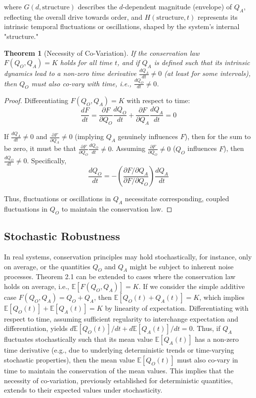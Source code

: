 \documentclass[11pt,a4paper]{article}
\newtheorem{theorem}{Theorem}[section]
\begin{document}
where $G(d, \text{structure})$ describes the $d$-dependent magnitude (envelope) of $Q_A$, reflecting the overall drive towards order, and $H(\text{structure}, t)$ represents its intrinsic temporal fluctuations or oscillations, shaped by the system's internal "structure."

\begin{theorem}[Necessity of Co-Variation]
If the conservation law $F(Q_O, Q_A) = K$ holds for all time $t$, and if $Q_A$ is defined such that its intrinsic dynamics lead to a non-zero time derivative $\frac{dQ_A}{dt} \neq 0$ (at least for some intervals), then $Q_O$ must also co-vary with time, i.e., $\frac{dQ_O}{dt} \neq 0$.
\end{theorem}

\begin{proof}
Differentiating $F(Q_O, Q_A) = K$ with respect to time:
\begin{equation}
    \frac{dF}{dt} = \frac{\partial F}{\partial Q_O}\frac{dQ_O}{dt} + \frac{\partial F}{\partial Q_A}\frac{dQ_A}{dt} = 0
\end{equation}

If $\frac{dQ_A}{dt} \neq 0$ and $\frac{\partial F}{\partial Q_A} \neq 0$ (implying $Q_A$ genuinely influences $F$), then for the sum to be zero, it must be that $\frac{\partial F}{\partial Q_O}\frac{dQ_O}{dt} \neq 0$. Assuming $\frac{\partial F}{\partial Q_O} \neq 0$ ($Q_O$ influences $F$), then $\frac{dQ_O}{dt} \neq 0$. Specifically,
\begin{equation}
    \frac{dQ_O}{dt} = - \left(\frac{\partial F/\partial Q_A}{\partial F/\partial Q_O}\right) \frac{dQ_A}{dt}
\end{equation}

Thus, fluctuations or oscillations in $Q_A$ necessitate corresponding, coupled fluctuations in $Q_O$ to maintain the conservation law.
\end{proof}

\subsection{Stochastic Robustness}
In real systems, conservation principles may hold stochastically, for instance, only on average, or the quantities $Q_O$ and $Q_A$ might be subject to inherent noise processes.
Theorem 2.1 can be extended to cases where the conservation law holds on average, i.e., $\mathbb{E}[F(Q_O, Q_A)] = K$. If we consider the simple additive case $F(Q_O, Q_A) = Q_O + Q_A$, then $\mathbb{E}[Q_O(t) + Q_A(t)] = K$, which implies $\mathbb{E}[Q_O(t)] + \mathbb{E}[Q_A(t)] = K$ by linearity of expectation. Differentiating with respect to time, assuming sufficient regularity to interchange expectation and differentiation, yields $d\mathbb{E}[Q_O(t)]/dt + d\mathbb{E}[Q_A(t)]/dt = 0$. Thus, if $Q_A$ fluctuates stochastically such that its mean value $\mathbb{E}[Q_A(t)]$ has a non-zero time derivative (e.g., due to underlying deterministic trends or time-varying stochastic properties), then the mean value $\mathbb{E}[Q_O(t)]$ must also co-vary in time to maintain the conservation of the mean values. This implies that the necessity of co-variation, previously established for deterministic quantities, extends to their expected values under stochasticity.
\end{document}
